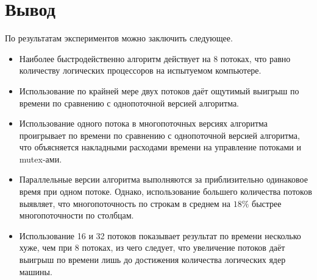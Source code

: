 \section*{Вывод}
По результатам экспериментов можно заключить следующее.
\begin{itemize}
	\item Наиболее быстродейственно алгоритм действует на 8 потоках, что равно количеству логических процессоров на испытуемом компьютере.
	\item Использование по крайней мере двух потоков даёт ощутимый выигрыш по времени по сравнению с однопоточной версией алгоритма.
	\item Использование одного потока в многопоточных версиях алгоритма проигрывает по времени по сравнению с однопоточной версией алгоритма, что объясняется накладными расходами времени на управление потоками и mutex-ами.
	\item Параллельные версии алгоритма выполняются за приблизительно одинаковое время при одном потоке. Однако, использование большего количества потоков выявляет, что многопоточность по строкам в среднем на $18\%$ быстрее многопоточности по столбцам.
	\item Использование 16 и 32 потоков показывает результат по времени несколько хуже, чем при 8 потоках, из чего следует, что увеличение потоков даёт выигрыш по времени лишь до достижения количества логических ядер машины.
\end{itemize}


	